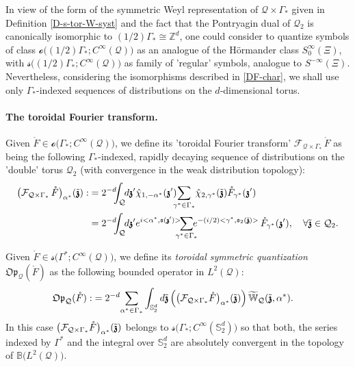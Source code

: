 \documentclass[12pt]{article}
\theoremstyle{definition}
\def\Zd{\mathbb{Z}^d}
\def\Op{\mathfrak{Op}}
\def\T{\mathcal{Q}}
\def\s{\mathfrak{s}}
\def\bz{\mathfrak{z}\hspace*{-4pt}\mathfrak{z}}
\def\beq{\begin{equation}}
\def\eeq{\end{equation}}
\def\Sd{\mathbb{S}^d}
\numberwithin{equation}{section}
\begin{document}
In view of the form of the symmetric Weyl representation of $\T\times\Gamma_*$ given in Definition \ref{D-s-tor-W-syst} and the fact that the Pontryagin dual of $\T_2$ is canonically isomorphic to $(1/2)\Gamma_{*}\cong\Zd$, one could consider to quantize symbols of class $\mathcal{o}\big((1/2)\Gamma_{*};C^\infty(\T)\big)$ as an analogue of the H\"{o}rmander class $S^\infty_0(\Xi )$, with $\mathcal{s}\big((1/2)\Gamma_{*};C^\infty(\T)\big)$ as family of 'regular' symbols, analogue to $S^{-\infty}(\Xi )$. Nevertheless, considering the isomorphisms described in \eqref{DF-char}, we shall use only $\Gamma_*$-indexed sequences of distributions on the $d$-dimensional torus.

\paragraph{The toroidal Fourier transform.}
Given $\mathring{F}\in \mathcal{o}\big(\Gamma_*;C^\infty(\T)\big)$, we define its 'toroidal Fourier transform'  $\mathcal{F}_{\T\times\Gamma_*}\,\mathring{F}$ as being the following $\Gamma_*$-indexed, rapidly decaying sequence of distributions on the 'double' torus $\T_2$ (with convergence in the weak distribution topology):
\beq\begin{split}
	\big(\mathcal{F}_{\T\times\Gamma_*}\,\mathring{F}\big)_{\alpha^*}(\tilde{\bz}):&=2^{-d}\hspace*{-5pt}\int_{\T}\hspace*{-3pt}d\bz'\hat{\chi}_{1,-\alpha^*}(\bz')\hspace*{-4pt}\underset{\gamma^*\in\Gamma_*}{\sum}\hat{\chi}_{2,\gamma^*}(\tilde{\bz})\mathring{F}_{\gamma^*}(\bz')\\
	&=2^{-d}\hspace*{-5pt}\int_{\T}\hspace*{-3pt}d\bz'e^{i<\alpha^*,\s(\bz')>}\hspace*{-6pt}\underset{\gamma^*\in\Gamma_*}{\sum}\hspace*{-5pt}e^{-(i/2)<\gamma^*,\s_2(\tilde{\bz})>}\,\mathring{F}_{\gamma^*}(\bz'),\quad\forall\tilde{\bz}\in\T_2.
\end{split}\eeq

Given $\mathring{F}\in \mathcal{s}\big(\Gamma^*;C^\infty(\T)\big)$,  we define its \textit{toroidal symmetric quantization} $\Op_{\T}(\mathring{F})$  as the following bounded operator in $L^2(\T)$:
\beq\begin{split}\label{DF-OpTF}
	\Op_{\T}(\mathring{F}):&=2^{-d}\underset{\alpha^*\in\Gamma_*}{\sum}\int_{\Sd_2}d\tilde{\bz}\,\Big(\big(\mathcal{F}_{\T\times\Gamma_*}\mathring{F}\big)_{\alpha^*}(\tilde{\bz})\Big)\,\widetilde{\mathbb{W}}_{\T}(\tilde{\bz},\alpha^*).
\end{split}\eeq
In this case $\big(\mathcal{F}_{\T\times\Gamma_*}\mathring{F}\big)_{\alpha^*}(\tilde{\bz})$ belongs to $\mathcal{s}\big(\Gamma_*;C^\infty(\Sd_2)\big)$ so that both, the series indexed by $\Gamma^*$ and the integral over $\Sd_2$ are absolutely convergent in the topology of $\mathbb{B}\big(L^2(\T)\big)$.
\end{document}
